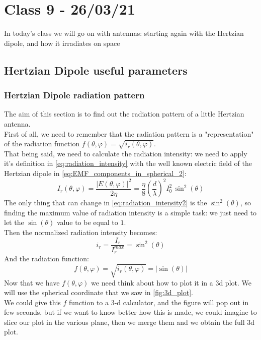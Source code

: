 \section*{Class 9 - 26/03/21}
In today's class we will go on with antennas: starting again with the Hertzian dipole, and how it irradiates on space
\subsection*{Hertzian Dipole useful parameters}
\subsubsection*{Hertzian Dipole radiation pattern}
The aim of this section is to find out the radiation pattern of a little Hertzian antenna.\\
First of all, we need to remember that the radiation pattern is a "representation" of the radiation function $f(\theta,\varphi)=\sqrt{i_r(\theta,\varphi)}$.\\
That being said, we need to calculate the radiation intensity: we need to apply it's definition in \cref{eq:radiation_intensity} with the well known electric field of the Hertzian dipole in \cref{eq:EMF_components_in_spherical_2}:
\begin{equation}\label{eq:radiation_intensity2}
    I_r(\theta, \varphi)=\frac{|E(\theta,\varphi)|^2}{2\eta}=\frac{\eta}{8}\left(\frac{d}{\lambda}\right)^2I_0^2\,\sin^2(\theta)
\end{equation}
The only thing that can change in \cref{eq:radiation_intensity2} is the $\sin^2(\theta)$, so finding the maximum value of radiation intensity is a simple task: we just need to let the $\sin(\theta)$ value to be equal to $1$.\\
Then the normalized radiation intensity becomes:
\begin{equation}\label{eq:normalized_rad_intensity}
    i_r=\frac{I_r}{I_r^{max}}=\sin^2(\theta)
\end{equation}
And the radiation function:
\begin{equation}
    f(\theta,\varphi)=\sqrt{i_r(\theta,\varphi)}=|\sin(\theta)|
\end{equation}
Now that we have $f(\theta, \varphi)$ we need think about how to plot it in a 3d plot. We will use the spherical coordinate that we saw in \cref{fig:3d_plot}.\\
We could give this $f$ function to a 3-d calculator, and the figure will pop out in few seconds, but if we want to know better how this is made, we could imagine to slice our plot in the various plane, then we merge them and we obtain the full 3d plot.\\
